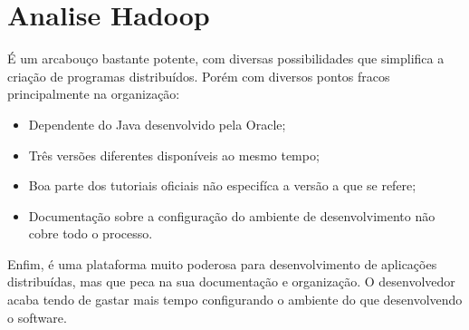 \documentclass[a4paper,11pt]{report}
\begin{document}
\chapter{Analise Hadoop}
É um arcabouço bastante potente, com diversas possibilidades que simplifica a criação de programas distribuídos. Porém com diversos pontos fracos principalmente na organização:

\begin{itemize}
  \item Dependente do Java desenvolvido pela Oracle;
  \item Três versões diferentes disponíveis ao mesmo tempo;
  \item Boa parte dos tutoriais oficiais não especifíca a versão a que se refere;
  \item Documentação sobre a configuração do ambiente de desenvolvimento não cobre todo o processo.
\end{itemize}

Enfim, é uma plataforma muito poderosa para desenvolvimento de aplicações distribuídas, mas que peca na sua documentação e organização. O desenvolvedor acaba tendo de gastar mais tempo configurando o ambiente do que desenvolvendo o software.
\end{document}
